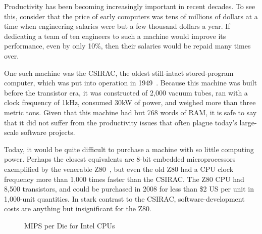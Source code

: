 Productivity has been becoming increasingly important in recent decades.
To see this, consider that the price of early computers was tens
of millions of dollars at
a time when engineering salaries were but a few thousand dollars a year.
If dedicating a team of ten engineers to such a machine would improve
its performance, even by only 10\%, then their salaries
would be repaid many times over.

One such machine was the CSIRAC, the oldest still-intact stored-program
computer, which was put into operation in
1949~\cite{CSIRACMuseumVictoria,CSIRACUniversityMelbourne}.
Because this machine was built before the transistor era, it was constructed
of 2,000 vacuum tubes, ran with a clock frequency of 1kHz,
consumed 30kW of power, and weighed more than three metric tons.
Given that this machine had but 768 words of RAM, it is safe to say that
it did not suffer from the productivity issues that often plague
today's large-scale software projects.

Today, it would be quite difficult to purchase a machine with so
little computing power.
Perhaps the closest equivalents
are 8-bit embedded microprocessors exemplified by the venerable
Z80~\cite{z80Wikipedia}, but even the old Z80 had a CPU clock
frequency more than 1,000 times faster than the CSIRAC.
The Z80 CPU had 8,500 transistors, and could be purchased in 2008
for less than \$2 US per unit in 1,000-unit quantities.
In stark contrast to the CSIRAC, software-development costs are
anything but insignificant for the Z80.

\begin{figure}[tb]
\begin{center}
\end{center}
\caption{MIPS per Die for Intel CPUs}
\label{fig:intro:MIPS per Die for Intel CPUs}
\end{figure}

